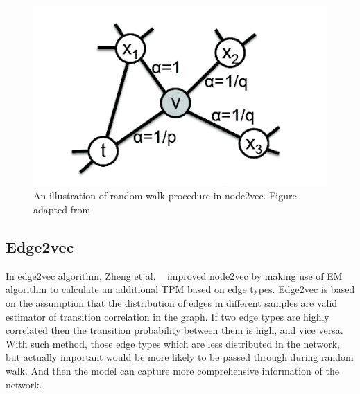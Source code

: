 \begin{figure}[!h]
    \centering
    \includegraphics[scale=0.4]
    {figures/node2vec.png}
    \captionsetup{justification=centering}
    \caption[An illustration of random walk procedure in node2vec]{\label{fig:node2vec} An illustration of random walk procedure in node2vec. Figure adapted from ~\cite{grover_node2vec:_2016}}
\end{figure}

\subsection{Edge2vec}

In edge2vec algorithm, Zheng et al. ~\cite{gao_edge2vec:_2018} improved node2vec by making use of \ac{EM} algorithm to calculate an additional TPM based on edge types. Edge2vec is based on the assumption that the distribution of edges in different samples are valid estimator of transition correlation in the graph. If two edge types are highly correlated then the transition probability between them is high, and vice versa. With such method, those edge types which are less distributed in the network, but actually important would be more likely to be passed through during random walk. And then the model can capture more comprehensive information of the network.

